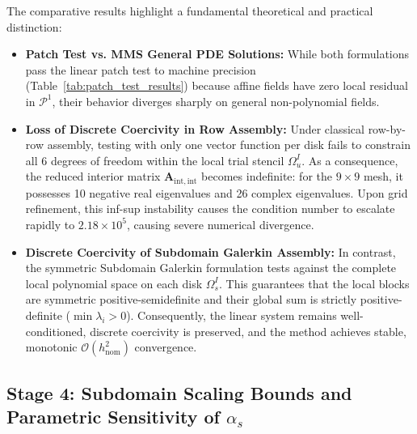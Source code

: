 \documentclass[preprint,12pt]{elsarticle}
\begin{document}
The comparative results highlight a fundamental theoretical and practical distinction:
\begin{itemize}
    \item \textbf{Patch Test vs. MMS General PDE Solutions:} While both formulations pass the linear patch test to machine precision (Table~\ref{tab:patch_test_results}) because affine fields have zero local residual in $\mathcal{P}^1$, their behavior diverges sharply on general non-polynomial fields.
    \item \textbf{Loss of Discrete Coercivity in Row Assembly:} Under classical row-by-row assembly, testing with only one vector function per disk fails to constrain all 6 degrees of freedom within the local trial stencil $\Omega_u^I$. As a consequence, the reduced interior matrix $\mathbf{A}_{\mathrm{int}, \mathrm{int}}$ becomes indefinite: for the $9 \times 9$ mesh, it possesses 10 negative real eigenvalues and 26 complex eigenvalues. Upon grid refinement, this inf-sup instability causes the condition number to escalate rapidly to $2.18 \times 10^5$, causing severe numerical divergence.
    \item \textbf{Discrete Coercivity of Subdomain Galerkin Assembly:} In contrast, the symmetric Subdomain Galerkin formulation tests against the complete local polynomial space on each disk $\Omega_s^I$. This guarantees that the local blocks are symmetric positive-semidefinite and their global sum is strictly positive-definite ($\min \lambda_i > 0$). Consequently, the linear system remains well-conditioned, discrete coercivity is preserved, and the method achieves stable, monotonic $\mathcal{O}(h_{\mathrm{nom}}^2)$ convergence.
\end{itemize}

\subsection{Stage 4: Subdomain Scaling Bounds and Parametric Sensitivity of $\alpha_s$}
\label{subsec:stage4_alpha_s}
\end{document}
